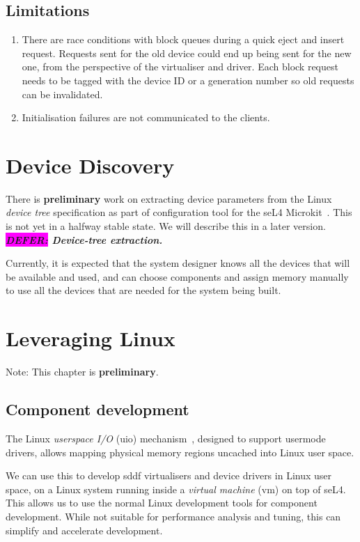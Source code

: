 \documentclass[a4paper,12pt]{report}
\newcommand{\DEFER}[1]{\textbf{\textsl{\colorbox{magenta}{DEFER:} #1}}}
\newcommand{\DEFER}[1]{\relax}
\begin{document}
\section{Limitations}

\begin{enumerate}
  \item There are race conditions with block queues during a quick eject and insert request.
        Requests sent for the old device could end up being sent for the new one,
        from the perspective of the virtualiser and driver.
        Each block request needs to be tagged with the device ID or a generation
        number so old requests can be invalidated.

  \item Initialisation failures are not communicated to the clients.
\end{enumerate}
\fi

\chapter{Device Discovery}\label{s:discovery}

There is \textbf{preliminary} work on extracting device parameters
from the Linux \emph{device tree} specification as part of
configuration tool for the seL4 Microkit~\citep{microkit:url}.
This is not yet in a halfway stable state. We will
describe this in a later version. \DEFER{Device-tree extraction.}

Currently, it is expected that the system designer knows all the
devices that will be available and used, and can choose components and
assign memory manually to use all the devices that are needed for the
system being built.

\chapter{Leveraging Linux}\label{s:linux}

Note: This chapter is \textbf{preliminary}.

\section{Component development}

The Linux \emph{userspace I/O} (\gls{uio})
mechanism~\citep{linux:uio}, designed to support usermode drivers,
allows mapping physical memory regions uncached into Linux user space.

We can use this to develop \gls{sddf} virtualisers and device drivers in
Linux user space, on a Linux system running inside a \emph{virtual
  machine} (\gls{vm}) on top of seL4. This allows us to use the normal Linux
development tools for component development. While not suitable for
performance analysis and tuning, this can simplify and accelerate
development.
\end{document}
